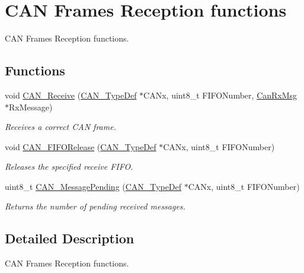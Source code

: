 \hypertarget{group___c_a_n___group3}{}\section{C\+A\+N Frames Reception functions}
\label{group___c_a_n___group3}


C\+A\+N Frames Reception functions.  


\subsection*{Functions}
\begin{DoxyCompactItemize}
\item 
void \hyperlink{group___c_a_n___group3_ga351b90bb8a3bb0c846f85bbd56ef4dc8}{C\+A\+N\+\_\+\+Receive} (\hyperlink{struct_c_a_n___type_def}{C\+A\+N\+\_\+\+Type\+Def} $\ast$C\+A\+Nx, uint8\+\_\+t F\+I\+F\+O\+Number, \hyperlink{struct_can_rx_msg}{Can\+Rx\+Msg} $\ast$Rx\+Message)
\begin{DoxyCompactList}\small\item\em Receives a correct C\+A\+N frame. \end{DoxyCompactList}\item 
void \hyperlink{group___c_a_n___group3_ga1bc3b39471e579b4101624c33d27918b}{C\+A\+N\+\_\+\+F\+I\+F\+O\+Release} (\hyperlink{struct_c_a_n___type_def}{C\+A\+N\+\_\+\+Type\+Def} $\ast$C\+A\+Nx, uint8\+\_\+t F\+I\+F\+O\+Number)
\begin{DoxyCompactList}\small\item\em Releases the specified receive F\+I\+F\+O. \end{DoxyCompactList}\item 
uint8\+\_\+t \hyperlink{group___c_a_n___group3_ga7100459a95ce1b3cfe8ab15e112029fe}{C\+A\+N\+\_\+\+Message\+Pending} (\hyperlink{struct_c_a_n___type_def}{C\+A\+N\+\_\+\+Type\+Def} $\ast$C\+A\+Nx, uint8\+\_\+t F\+I\+F\+O\+Number)
\begin{DoxyCompactList}\small\item\em Returns the number of pending received messages. \end{DoxyCompactList}\end{DoxyCompactItemize}


\subsection{Detailed Description}
C\+A\+N Frames Reception functions. 

